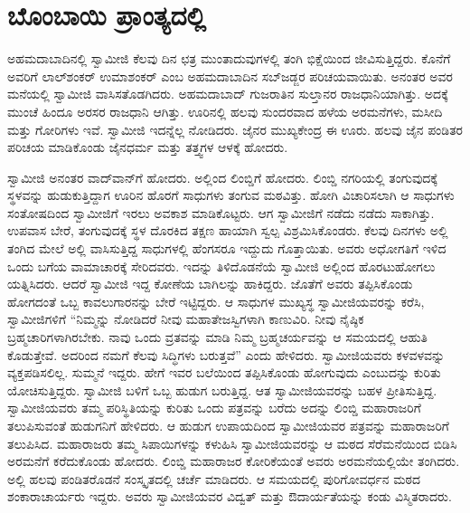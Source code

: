 
\chapter{ಬೊಂಬಾಯಿ ಪ್ರಾಂತ್ಯದಲ್ಲಿ}

ಅಹಮದಾಬಾದಿನಲ್ಲಿ ಸ್ವಾಮೀಜಿ ಕೆಲವು ದಿನ ಛತ್ರ ಮುಂತಾದುವುಗಳಲ್ಲಿ ತಂಗಿ ಭಿಕ್ಷೆಯಿಂದ ಜೀವಿಸುತ್ತಿದ್ದರು. ಕೊನೆಗೆ ಅವರಿಗೆ ಲಾಲ್‍ಶಂಕರ್ ಉಮಾಶಂಕರ್ ಎಂಬ ಅಹಮದಾಬಾದಿನ ಸಬ್‍ಜಡ್ಜರ ಪರಿಚಯವಾಯಿತು. ಅನಂತರ ಅವರ ಮನೆಯಲ್ಲಿ ಸ್ವಾಮೀಜಿ ವಾಸಿಸತೊಡಗಿದರು. ಅಹಮದಾಬಾದ್ ಗುಜರಾತಿನ ಸುಲ್ತಾನರ ರಾಜಧಾನಿಯಾಗಿತ್ತು. ಅದಕ್ಕೆ ಮುಂಚೆ ಹಿಂದೂ ಅರಸರ ರಾಜಧಾನಿ ಆಗಿತ್ತು. ಊರಿನಲ್ಲಿ ಹಲವು ಸುಂದರವಾದ ಹಳೆಯ ಅರಮನೆಗಳು, ಮಸೀದಿ ಮತ್ತು ಗೋರಿಗಳು ಇವೆ. ಸ್ವಾಮೀಜಿ ಇದನ್ನೆಲ್ಲ ನೋಡಿದರು. ಜೈನರ ಮುಖ್ಯಕೇಂದ್ರ ಈ ಊರು. ಹಲವು ಜೈನ ಪಂಡಿತರ ಪರಿಚಯ ಮಾಡಿಕೊಂಡು ಜೈನಧರ್ಮ ಮತ್ತು ತತ್ತ್ವಗಳ ಆಳಕ್ಕೆ ಹೋದರು.

ಸ್ವಾಮೀಜಿ ಅನಂತರ ವಾದ್‍ವಾನ್‍ಗೆ ಹೋದರು. ಅಲ್ಲಿಂದ ಲಿಂಬ್ಡಿಗೆ ಹೋದರು. ಲಿಂಬ್ಡಿ ನಗರಿಯಲ್ಲಿ ತಂಗುವುದಕ್ಕೆ ಸ್ಥಳವನ್ನು ಹುಡುಕುತ್ತಿದ್ದಾಗ ಊರಿನ ಹೊರಗೆ ಸಾಧುಗಳು ತಂಗುವ ಮಠವಿತ್ತು. ಹೋಗಿ ವಿಚಾರಿಸಲಾಗಿ ಆ ಸಾಧುಗಳು ಸಂತೋಷದಿಂದ ಸ್ವಾಮೀಜಿಗೆ ಇರಲು ಅವಕಾಶ ಮಾಡಿಕೊಟ್ಟರು. ಆಗ ಸ್ವಾಮೀಜಿಗೆ ನಡೆದು ನಡೆದು ಸಾಕಾಗಿತ್ತು. ಉಪವಾಸ ಬೇರೆ, ತಂಗುವುದಕ್ಕೆ ಸ್ಥಳ ದೊರಕಿದ ತಕ್ಷಣ ಹಾಯಾಗಿ ಸ್ವಲ್ಪ ವಿಶ್ರಮಿಸಿಕೊಂಡರು. ಕೆಲವು ದಿನಗಳು ಅಲ್ಲಿ ತಂಗಿದ ಮೇಲೆ ಅಲ್ಲಿ ವಾಸಿಸುತ್ತಿದ್ದ ಸಾಧುಗಳಲ್ಲಿ ಹೆಂಗಸರೂ ಇದ್ದುದು ಗೊತ್ತಾಯಿತು. ಅವರು ಅಧೋಗತಿಗೆ ಇಳಿದ ಒಂದು ಬಗೆಯ ವಾಮಾಚಾರಕ್ಕೆ ಸೇರಿದವರು. ಇದನ್ನು ತಿಳಿದೊಡನೆಯೆ ಸ್ವಾಮೀಜಿ ಅಲ್ಲಿಂದ ಹೊರಟುಹೋಗಲು ಯತ್ನಿಸಿದರು. ಆದರೆ ಸ್ವಾಮೀಜಿ ಇದ್ದ ಕೋಣೆಯ ಬಾಗಿಲನ್ನು ಹಾಕಿದ್ದರು. ಜೊತೆಗೆ ಅವರು ತಪ್ಪಿಸಿಕೊಂಡು ಹೋಗದಂತೆ ಒಬ್ಬ ಕಾವಲುಗಾರನನ್ನು ಬೇರೆ ಇಟ್ಟಿದ್ದರು. ಆ ಸಾಧುಗಳ ಮುಖ್ಯಸ್ಥ ಸ್ವಾಮೀಜಿಯವರನ್ನು ಕರೆಸಿ, ಸ್ವಾಮೀಜಿಗಳಿಗೆ “ನಿಮ್ಮನ್ನು ನೋಡಿದರೆ ನೀವು ಮಹಾತೇಜಸ್ವಿಗಳಾಗಿ ಕಾಣುವಿರಿ. ನೀವು ನೈಷ್ಠಿಕ ಬ್ರಹ್ಮಚಾರಿಗಳಾಗಿರಬೇಕು. ನಾವು ಒಂದು ವ್ರತವನ್ನು ಮಾಡಿ ನಿಮ್ಮ ಬ್ರಹ್ಮಚರ್ಯವನ್ನು ಆ ಸಮಯದಲ್ಲಿ ಆಹುತಿ ಕೊಡುತ್ತೇವೆ. ಅದರಿಂದ ನಮಗೆ ಕೆಲವು ಸಿದ್ಧಿಗಳು ಬರುತ್ತವೆ” ಎಂದು ಹೇಳಿದರು. ಸ್ವಾಮೀಜಿಯವರು ಕಳವಳವನ್ನು ವ್ಯಕ್ತಪಡಿಸಲಿಲ್ಲ. ಸುಮ್ಮನೆ ಇದ್ದರು. ಹೇಗೆ ಇವರ ಬಲೆಯಿಂದ ತಪ್ಪಿಸಿಕೊಂಡು ಹೋಗುವುದು ಎಂಬುದನ್ನು ಕುರಿತು ಯೋಚಿಸುತ್ತಿದ್ದರು. ಸ್ವಾಮೀಜಿ ಬಳಿಗೆ ಒಬ್ಬ ಹುಡುಗ ಬರುತ್ತಿದ್ದ. ಆತ ಸ್ವಾಮೀಜಿಯವರನ್ನು ಬಹಳ ಪ್ರೀತಿಸುತ್ತಿದ್ದ. ಸ್ವಾಮೀಜಿಯವರು ತಮ್ಮ ಪರಿಸ್ಥಿತಿಯನ್ನು ಕುರಿತು ಒಂದು ಪತ್ರವನ್ನು ಬರೆದು ಅದನ್ನು ಲಿಂಬ್ಡಿ ಮಹಾರಾಜರಿಗೆ ತಲುಪಿಸುವಂತೆ ಹುಡುಗನಿಗೆ ಹೇಳಿದರು. ಆ ಹುಡುಗ ಉಪಾಯದಿಂದ ಸ್ವಾಮೀಜಿಯವರ ಪತ್ರವನ್ನು ಮಹಾರಾಜರಿಗೆ ತಲುಪಿಸಿದ. ಮಹಾರಾಜರು ತಮ್ಮ ಸಿಪಾಯಿಗಳನ್ನು ಕಳುಹಿಸಿ ಸ್ವಾಮೀಜಿಯವರನ್ನು ಆ ಮಠದ ಸೆರೆಮನೆಯಿಂದ ಬಿಡಿಸಿ ಅರಮನೆಗೆ ಕರೆದುಕೊಂಡು ಹೋದರು. ಲಿಂಬ್ಡಿ ಮಹಾರಾಜರ ಕೋರಿಕೆಯಂತೆ ಅವರು ಅರಮನೆಯಲ್ಲಿಯೇ ತಂಗಿದರು. ಅಲ್ಲಿ ಹಲವು ಪಂಡಿತರೊಡನೆ ಸಂಸ್ಕೃತದಲ್ಲಿ ಚರ್ಚೆ ಮಾಡಿದರು. ಆ ಸಮಯದಲ್ಲಿ ಪುರಿಗೋವರ್ಧನ ಮಠದ ಶಂಕಾರಾಚಾರ್ಯರು ಇದ್ದರು. ಅವರು ಸ್ವಾಮೀಜಿಯವರ ವಿದ್ವತ್ ಮತ್ತು ಔದಾರ್ಯತೆಯನ್ನು ಕಂಡು ವಿಸ್ಮಿತರಾದರು. 

